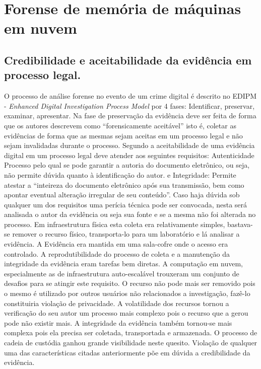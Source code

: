 \chapter{Forense de memória de máquinas em nuvem}

\section{Credibilidade e aceitabilidade da evidência em processo legal.}
\label{sec:credibilidadeaceitabilidadeevidencia}

O processo de análise forense no evento de um crime digital é descrito no EDIPM - \textit{Enhanced Digital Investigation Process Model} por 4 fases: Identificar, preservar, examinar, apresentar. \cite{GrisposChallengesCloudComputing:2012}
%
Na fase de preservação da evidência deve ser feita de forma que os autores descrevem como ``forensicamente aceitável'' isto é, coletar as evidências de forma que as mesmas sejam aceitas em um processo legal e não sejam invalidadas durante o processo.
%
Segundo \cite{Ramos:2011} a aceitabilidade de uma evidência digital em um processo legal deve atender aos seguintes requisitos: Autenticidade Processo pelo qual se pode garantir a autoria do documento eletrônico, ou seja, não permite dúvida quanto à identificação do autor.
%
e Integridade: Permite atestar a “inteireza do documento eletrônico após sua transmissão, bem como apontar eventual alteração irregular de seu conteúdo”.
%
Caso haja dúvida sob qualquer um dos requisitos uma perícia técnica pode ser convocada, nesta será analisada o autor da evidência ou seja sua fonte e se a mesma não foi alterada no processo.
%
Em infraestrutura física esta coleta era relativamente simples, bastava-se remover o recurso físico, transporta-lo para um laboratório e lá analisar a evidência. A Evidência era mantida em uma sala-cofre onde o acesso era controlado.
%
A reprodutibilidade do processo de coleta e a manutenção da integridade da evidência eram tarefas bem diretas.
%
A computação em nuvem, especialmente as de infraestrutura auto-escalável trouxeram um conjunto de desafios para se atingir este requisito. O recurso não pode mais ser removido pois o mesmo é utilizado por outros usuários não relacionados a investigação, fazê-lo constituiria violação de privacidade.
%
A volatilidade dos recursos tornou a verificação do seu autor um processo mais complexo pois o recurso que a gerou pode não existir mais.
%
A integridade da evidência também tornou-se mais complexa pois ela precisa ser coletada, transportada e armazenada. O processo de cadeia de custódia ganhou grande visibilidade neste quesito.
%
Violação de qualquer uma das características citadas anteriormente põe em dúvida a credibilidade da evidência.



